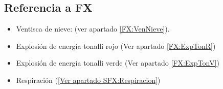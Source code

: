         \subsection{Referencia a FX}
\begin{itemize} 
        \item Ventisca de nieve: (ver apartado \ref{FX:VenNieve}).
        \item Explosión de energía tonalli rojo (Ver apartado \ref{FX:ExpTonR})
	\item Explosión de energía tonalli verde (Ver apartado \ref{FX:ExpTonV})
	\item Respiración (\ref{Ver apartado SFX:Respiracion}) 
\end{itemize} 